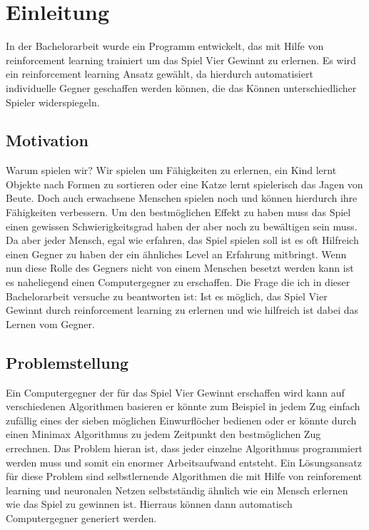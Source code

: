 \chapter{Einleitung}
\label{cha:Einleitung}

In der Bachelorarbeit wurde ein Programm entwickelt, das mit Hilfe von reinforcement learning trainiert um das Spiel Vier Gewinnt zu erlernen. 
Es wird ein reinforcement learning Ansatz gewählt, da hierdurch automatisiert individuelle Gegner geschaffen werden können, die das Können unterschiedlicher Spieler widerspiegeln.%


\section{Motivation}
Warum spielen wir? Wir spielen um Fähigkeiten zu erlernen, ein Kind lernt Objekte nach Formen zu sortieren oder eine Katze lernt spielerisch das Jagen von Beute. Doch auch erwachsene Menschen spielen noch und können hierdurch ihre Fähigkeiten verbessern. Um den bestmöglichen Effekt zu haben muss das Spiel einen gewissen Schwierigkeitsgrad haben der aber noch zu bewältigen sein muss. Da aber jeder Mensch, egal wie erfahren, das Spiel spielen soll ist es oft Hilfreich einen Gegner zu haben der ein ähnliches Level an Erfahrung mitbringt. Wenn nun diese Rolle des Gegners nicht von einem Menschen besetzt werden kann ist es naheliegend einen Computergegner zu erschaffen. Die Frage die ich in dieser Bachelorarbeit versuche zu beantworten ist:   Ist es möglich, das Spiel Vier Gewinnt durch reinforcement learning zu erlernen und wie hilfreich ist dabei das Lernen vom Gegner.


\section{Problemstellung}
Ein Computergegner der für das Spiel Vier Gewinnt erschaffen wird kann auf verschiedenen Algorithmen basieren er könnte zum Beispiel in jedem Zug einfach zufällig eines der sieben möglichen Einwurflöcher bedienen oder er könnte durch einen Minimax Algorithmus zu jedem Zeitpunkt den bestmöglichen Zug errechnen. 
Das Problem hieran ist, dass jeder einzelne Algorithmus programmiert werden muss und somit ein enormer Arbeitsaufwand entsteht.
Ein Lösungsansatz für diese Problem sind selbstlernende Algorithmen die mit Hilfe von reinforement learning und neuronalen Netzen selbstständig ähnlich wie ein Mensch erlernen wie das Spiel zu gewinnen ist. Hierraus können dann automatisch Computergegner generiert werden. 


